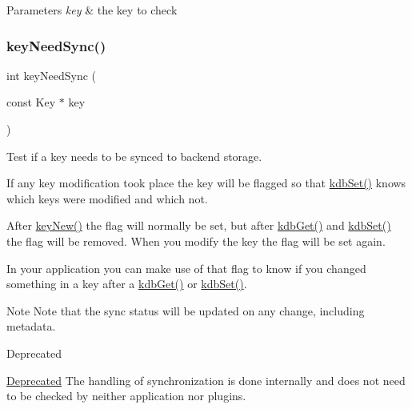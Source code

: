 \begin{DoxyParams}{Parameters}
{\em key} & the key to check \\
\hline
\end{DoxyParams}
\mbox{\label{group__keytest_gaf247df0de7aca04b32ef80e39ef12950}} 
\subsubsection{\texorpdfstring{key\+Need\+Sync()}{keyNeedSync()}}
{\footnotesize\ttfamily int key\+Need\+Sync (\begin{DoxyParamCaption}\item[{const Key $\ast$}]{key }\end{DoxyParamCaption})}



Test if a key needs to be synced to backend storage. 

If any key modification took place the key will be flagged so that \hyperlink{group__kdb_ga11436b058408f83d303ca5e996832bcf}{kdb\+Set()} knows which keys were modified and which not.

After \hyperlink{group__key_gad23c65b44bf48d773759e1f9a4d43b89}{key\+New()} the flag will normally be set, but after \hyperlink{group__kdb_ga28e385fd9cb7ccfe0b2f1ed2f62453a1}{kdb\+Get()} and \hyperlink{group__kdb_ga11436b058408f83d303ca5e996832bcf}{kdb\+Set()} the flag will be removed. When you modify the key the flag will be set again.

In your application you can make use of that flag to know if you changed something in a key after a \hyperlink{group__kdb_ga28e385fd9cb7ccfe0b2f1ed2f62453a1}{kdb\+Get()} or \hyperlink{group__kdb_ga11436b058408f83d303ca5e996832bcf}{kdb\+Set()}.

\begin{DoxyNote}{Note}
Note that the sync status will be updated on any change, including metadata.
\end{DoxyNote}
\begin{DoxyRefDesc}{Deprecated}
\item[\hyperlink{deprecated__deprecated000012}{Deprecated}]The handling of synchronization is done internally and does not need to be checked by neither application nor plugins.\end{DoxyRefDesc}



